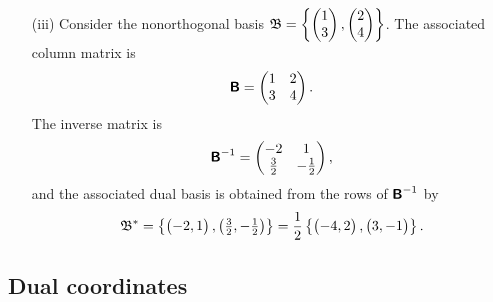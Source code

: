 {\begin{itemize}
\item[(iii)]
Consider the nonorthogonal basis
${\frak B} =
\left\{\begin{pmatrix}1\\3\end{pmatrix}, \begin{pmatrix}2\\ 4\end{pmatrix}\right\}$.
The associated column matrix is
\begin{equation}
\textsf{\textbf{B}}
=
\begin{pmatrix}
1&2\\
3&4
\end{pmatrix}
.
\end{equation}
The inverse matrix is
\begin{equation}
\textsf{\textbf{B}}^{-1}
=
\begin{pmatrix}
-2&1\\
\frac{3}{2}&-\frac{1}{2}
\end{pmatrix}
,
\end{equation}
and the associated dual basis is obtained from the rows of $\textsf{\textbf{B}}^{-1} $ by
\begin{equation}
{\frak B}^\ast  =
\left\{
\begin{pmatrix}
-2, 1
\end{pmatrix},
\begin{pmatrix}
\frac{3}{2},
-\frac{1}{2}
\end{pmatrix}
\right\} = \frac{1}{2}
\left\{
\begin{pmatrix}
-4,
2
\end{pmatrix},
\begin{pmatrix}
3,
-1
\end{pmatrix}
\right\}
.
\label{2011-m-cenobdb}
\end{equation}
\eexample
\end{itemize}
}


\subsection{Dual coordinates}

